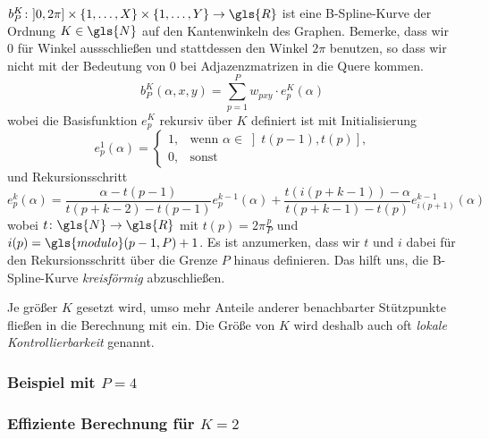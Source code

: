 $b_P^K \colon \left]0, 2\pi\right] \times \left\{1, \ldots, X \right\} \times \left\{1, \ldots, Y\right\} \to \gls{R}$ ist eine B-Spline-Kurve der Ordnung $K \in \gls{N}$ auf den Kantenwinkeln des Graphen.
Bemerke, dass wir $0$ für Winkel aussschließen und stattdessen den Winkel $2\pi$ benutzen, so dass wir nicht mit der Bedeutung von $0$ bei Adjazenzmatrizen in die Quere kommen.
\begin{equation}
  b_P^K\left(\alpha, x, y \right) = \sum_{p=1}^P w_{pxy} \cdot e_p^K\left(\alpha\right)
\end{equation}
wobei die Basisfunktion $e_p^K$ rekursiv über $K$ definiert ist mit Initialisierung
\begin{equation}
  e_p^1\left(\alpha\right) = \begin{cases}
    1, & \text{wenn }\alpha \in \left] t\left(p-1\right), t\left(p\right)\right]\text{,}\\
    0, & \text{sonst}
  \end{cases}
\end{equation}
und Rekursionsschritt
\begin{equation}
  e_p^k\left(\alpha\right) = \frac{\alpha - t\left(p - 1\right)}{t\left(p+k-2\right) - t\left(p - 1\right)} e_p^{k-1}\left(\alpha\right) + \frac{t\left(i\left(p + k - 1\right)\right) - \alpha}{t\left(p+k - 1\right) - t\left(p\right)} e_{i\left(p+1\right)}^{k-1}\left(\alpha\right)
\end{equation}
wobei $t \colon \gls{N} \to \gls{R}$ mit $t\left(p\right) = 2\pi\frac{p}{P}$ und $i\left(p\right) = \gls{modulo}\left(p-1, P\right) + 1$.
Es ist anzumerken, dass wir $t$ und $i$ dabei für den Rekursionsschritt über die Grenze $P$ hinaus definieren.
Das hilft uns, die B-Spline-Kurve \emph{kreisförmig} abzuschließen.

Je größer $K$ gesetzt wird, umso mehr Anteile anderer benachbarter Stützpunkte fließen in die Berechnung mit ein.
Die Größe von $K$ wird deshalb auch oft \emph{lokale Kontrollierbarkeit} genannt.

\subsubsection{Beispiel mit $P=4$}



\subsubsection{Effiziente Berechnung für $K=2$}

